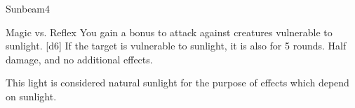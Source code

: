 \begin{spellsection}{Sunbeam}{4}
    \begin{spellheader}
    \end{spellheader}
    \begin{spellcontent}
        \begin{spelltargetinginfo}
        \end{spelltargetinginfo}
        \begin{spelleffects}
            \begin{spellattack}{Magic vs. Reflex}
                \spellspecial You gain a  bonus to attack against creatures vulnerable to sunlight.
                \spellsuccess {}[d6]
                \spellcritical If the target is vulnerable to sunlight, it is also \blinded for 5 rounds.
                \spellfailure Half damage, and no additional effects.
            \end{spellattack}
        \end{spelleffects}
    \end{spellcontent}
    \begin{spellfooter}
        \spellnotes This light is considered natural sunlight for the purpose of effects which depend on sunlight.
        \miscastexplode
    \end{spellfooter}
\end{spellsection}


